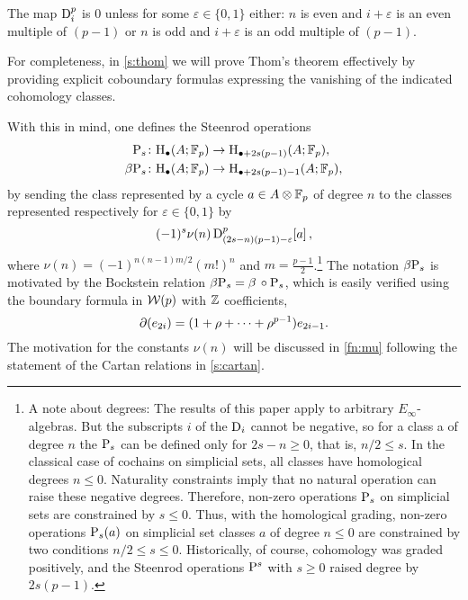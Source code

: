 \begin{theorem}[Thom]\label{t:thom}
	The map $\mathrm{D}_i^p$ is $0$ unless for some $\varepsilon \in \{0,1\}$ either: $n$ is even and $i+\varepsilon$ is an even multiple of $(p-1)$ or $n$ is odd and $i+\varepsilon$ is an odd multiple of $(p-1)$.
\end{theorem}

For completeness, in \cref{s:thom} we will prove Thom's theorem effectively by providing explicit coboundary formulas expressing the vanishing of the indicated cohomology classes.

With this in mind, one defines the Steenrod operations
\begin{align*}
	\mathrm{P}_s \colon& \mathrm{H}_\bullet(A; {\mathbb{F}_p}) \to \mathrm{H}_{\bullet + 2s(p-1)}(A; {\mathbb{F}_p}), \\
	\beta \mathrm{P}_s \colon& \mathrm{H}_\bullet(A; {\mathbb{F}_p}) \to \mathrm{H}_{\bullet + 2s(p-1) - 1}(A; {\mathbb{F}_p}),
\end{align*}
by sending the class represented by a cycle $a \in A \otimes {\mathbb{F}_p}$ of degree $n$ to the classes represented respectively for $\varepsilon \in \{0,1\}$ by
\[
(-1)^s \nu(n) \, \mathrm{D}^p_{(2s-n)(p-1)-\varepsilon}[a] \,,
\]
where $\nu(n) = (-1)^{n(n-1)m/2}(m!)^n$ and $m = \frac{p-1}{2}$.\footnote{
	A note about degrees:
	The results of this paper apply to arbitrary $E_\infty$-algebras.
	But the subscripts $i$ of the $\mathrm{D}_i$ cannot be negative, so for a class a of degree $n$ the $\mathrm{P}_s$ can be defined only for $2s-n \geq 0$, that is, $n/2 \leq s$.
	In the classical case of cochains on simplicial sets, all classes have homological degrees $n \leq 0$.
	Naturality constraints imply that no natural operation can raise these negative degrees.
	Therefore, non-zero operations $\mathrm{P}_s$ on simplicial sets are constrained by $s \leq 0$.
	Thus, with the homological grading, non-zero operations $\mathrm{P}_s(a)$ on simplicial set classes $a$ of degree $n \leq 0$ are constrained by two conditions $n/2 \leq s \leq 0$.
	Historically, of course, cohomology was graded positively, and the Steenrod operations $\mathrm{P}^s$ with $s \geq 0$ raised degree by $2s(p-1)$.
}
The notation $\beta \mathrm{P}_s$ is motivated by the Bockstein relation $\beta \mathrm{P}_s = \beta\, \mathbin{\circ} \mathrm{P}_s$, which is easily verified using the boundary formula in $\mathcal{W}(p)$ with $\mathbb{Z}$ coefficients,
\[
\operatorname{\partial}(e_{2i}) = (1 + \rho + \dots + \rho^{p-1})e_{2i-1}.
\]
The motivation for the constants $\nu(n)$ will be discussed in \cref{fn:mu} following the statement of the Cartan relations in \cref{s:cartan}.